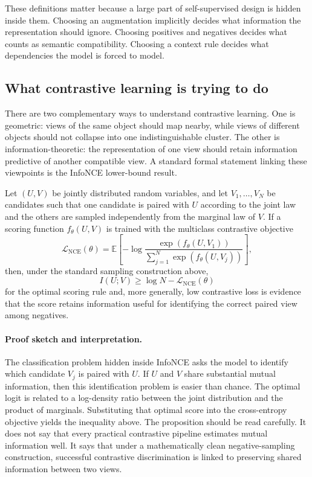 These definitions matter because a large part of self-supervised design is hidden inside them.
Choosing an augmentation implicitly decides what information the representation should ignore.
Choosing positives and negatives decides what counts as semantic compatibility.
Choosing a context rule decides what dependencies the model is forced to model.

\subsection*{What contrastive learning is trying to do}

There are two complementary ways to understand contrastive learning.
One is geometric: views of the same object should map nearby, while views of different objects should not collapse into one indistinguishable cluster.
The other is information-theoretic: the representation of one view should retain information predictive of another compatible view.
A standard formal statement linking these viewpoints is the InfoNCE lower-bound result.

\begin{proposition}
Let $(U,V)$ be jointly distributed random variables, and let $V_1,\dots,V_N$ be candidates such that one candidate is paired with $U$ according to the joint law and the others are sampled independently from the marginal law of $V$.
If a scoring function $f_\theta(U,V)$ is trained with the multiclass contrastive objective
\[
\mathcal{L}_{\mathrm{NCE}}(\theta)
=
\mathbb{E}
\left[
-\log
\frac{\exp(f_\theta(U,V_1))}
{\sum_{j=1}^{N} \exp(f_\theta(U,V_j))}
\right],
\]
then, under the standard sampling construction above,
\[
I(U;V) \ge \log N - \mathcal{L}_{\mathrm{NCE}}(\theta)
\]
for the optimal scoring rule and, more generally, low contrastive loss is evidence that the score retains information useful for identifying the correct paired view among negatives.
\end{proposition}

\paragraph{Proof sketch and interpretation.}
The classification problem hidden inside InfoNCE asks the model to identify which candidate $V_j$ is paired with $U$.
If $U$ and $V$ share substantial mutual information, then this identification problem is easier than chance.
The optimal logit is related to a log-density ratio between the joint distribution and the product of marginals.
Substituting that optimal score into the cross-entropy objective yields the inequality above.
The proposition should be read carefully.
It does not say that every practical contrastive pipeline estimates mutual information well.
It says that under a mathematically clean negative-sampling construction, successful contrastive discrimination is linked to preserving shared information between two views.

